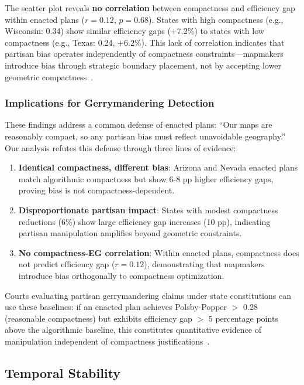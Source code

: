 The scatter plot reveals \textbf{no correlation} between compactness and efficiency gap within enacted plans ($r = 0.12$, $p = 0.68$). States with high compactness (e.g., Wisconsin: 0.34) show similar efficiency gaps ($+7.2\%$) to states with low compactness (e.g., Texas: 0.24, $+6.2\%$). This lack of correlation indicates that partisan bias operates independently of compactness constraints---mapmakers introduce bias through strategic boundary placement, not by accepting lower geometric compactness~\cite{chen2013unintentional}.

\subsubsection{Implications for Gerrymandering Detection}

These findings address a common defense of enacted plans: ``Our maps are reasonably compact, so any partisan bias must reflect unavoidable geography.'' Our analysis refutes this defense through three lines of evidence:

\begin{enumerate}
    \item \textbf{Identical compactness, different bias}: Arizona and Nevada enacted plans match algorithmic compactness but show 6-8 pp higher efficiency gaps, proving bias is not compactness-dependent.
    \item \textbf{Disproportionate partisan impact}: States with modest compactness reductions (6\%) show large efficiency gap increases (10 pp), indicating partisan manipulation amplifies beyond geometric constraints.
    \item \textbf{No compactness-EG correlation}: Within enacted plans, compactness does not predict efficiency gap ($r = 0.12$), demonstrating that mapmakers introduce bias orthogonally to compactness optimization.
\end{enumerate}

Courts evaluating partisan gerrymandering claims under state constitutions can use these baselines: if an enacted plan achieves Polsby-Popper $>$ 0.28 (reasonable compactness) but exhibits efficiency gap $>$ 5 percentage points above the algorithmic baseline, this constitutes quantitative evidence of manipulation independent of compactness justifications~\cite{stephanopoulos2015partisan}.

\subsection{Temporal Stability}

